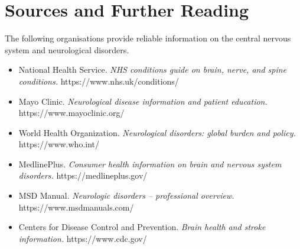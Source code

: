 \section*{Sources and Further Reading}
The following organisations provide reliable information on the central nervous system and neurological disorders.

\begin{itemize}
    \item National Health Service. \textit{NHS conditions guide on brain, nerve, and spine conditions.} https://www.nhs.uk/conditions/
    \item Mayo Clinic. \textit{Neurological disease information and patient education.} https://www.mayoclinic.org/
    \item World Health Organization. \textit{Neurological disorders: global burden and policy.} https://www.who.int/
    \item MedlinePlus. \textit{Consumer health information on brain and nervous system disorders.} https://medlineplus.gov/
    \item MSD Manual. \textit{Neurologic disorders -- professional overview.} https://www.msdmanuals.com/
    \item Centers for Disease Control and Prevention. \textit{Brain health and stroke information.} https://www.cdc.gov/
\end{itemize}
